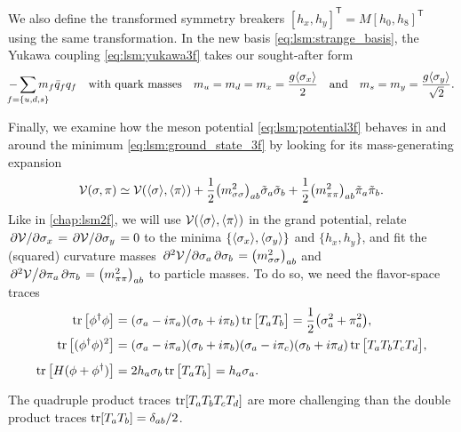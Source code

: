 We also define the transformed symmetry breakers 
$[h_x,h_y]^\mathsf{T} = M [h_0,h_8]^\mathsf{T}$
using the same transformation.
In the new basis \eqref{eq:lsm:strange_basis}, the Yukawa coupling \eqref{eq:lsm:yukawa3f} takes our sought-after form
\begin{equation}
	-\smashoperator{\sum_{f=\{u,d,s\}}} m_f \bar{q}_f q_f
	\quad \text{with quark masses} \quad
	m_u = m_d = m_x = \frac{g \avg{\sigma_x}}{2}
	\quad \text{and} \quad
	m_s = m_y = \frac{g \avg{\sigma_y}}{\sqrt{2}}.
\label{eq:lsm:quark_masses_3f}
\end{equation}

Finally, we examine how the meson potential \eqref{eq:lsm:potential3f} behaves in and around the minimum \eqref{eq:lsm:ground_state_3f}
by looking for its mass-generating expansion
\begin{equation}
	\mathcal{V}(\sigma,\pi) \simeq \mathcal{V}(\langle \sigma \rangle,\langle \pi \rangle) + \frac12 \big(m^2_{\sigma\sigma}\big)_{ab} \tilde{\sigma}_a \tilde{\sigma}_b + \frac12 \big(m^2_{\pi\pi}\big)_{ab} \tilde{\pi}_a \tilde{\pi}_b.
\label{eq:lsm3f:potential_before_diagonalization}
\end{equation}
Like in \cref{chap:lsm2f},
we will use $\mathcal{V}(\langle \sigma \rangle,\langle \pi \rangle)$ in the grand potential,
relate $\pdv{\mathcal{V}}/{\sigma_{x}}=\pdv{\mathcal{V}}/{\sigma_{y}}=0$
to the minima $\{\langle \sigma_x \rangle,\langle \sigma_y \rangle\}$ and $\{h_x,h_y\}$,
and fit the (squared) curvature masses
$\pdv{\mathcal{V}}/{\sigma_a, \sigma_b} = \smash{\big(m^2_{\sigma\sigma}\big)_{ab}}$
and
$\pdv{\mathcal{V}}/{\pi_a, \pi_b} = \smash{\big(m^2_{\pi\pi}\big)_{ab}}$
to particle masses.
To do so, we need the flavor-space traces
\begin{subequations}
\begin{align}
	\operatorname{tr}\big[\phi^\dagger \phi\big]     &= (\sigma_a - i \pi_a) (\sigma_b + i \pi_b) \operatorname{tr} \big[ T_a T_b \big] = \frac12 \big(\sigma_a^2+\pi_a^2\big) , \\
	\operatorname{tr}\big[(\phi^\dagger \phi)^2\big] &= (\sigma_a - i \pi_a) (\sigma_b + i \pi_b) (\sigma_a - i \pi_c) (\sigma_b + i \pi_d) \operatorname{tr} \big[ T_a T_b T_c T_d \big], \\
	\operatorname{tr}\big[H(\phi+\phi^\dagger)\big]  &= 2 h_a \sigma_b \operatorname{tr} \big[ T_a T_b \big] = \vphantom{\frac12} h_a \sigma_a . \label{eq:lsm3f:traces_hphi}
\end{align}%
\label{eq:lsm3f:traces}%
\end{subequations}%
The quadruple product traces $\operatorname{tr}[T_a T_b T_c T_d]$ are more challenging than the double product traces $\operatorname{tr}[T_a T_b] = \delta_{ab}/2$.
